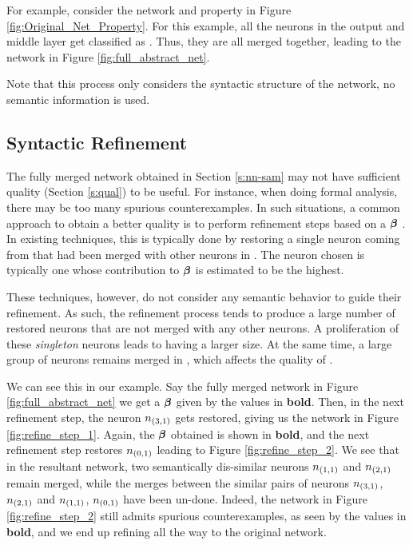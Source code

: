 


For example, consider the network and property in Figure
\ref{fig:Original_Net_Property}. For this example, all the neurons in the output
and middle layer get classified as \inc. Thus, they are all merged together,
leading to the network in Figure \ref{fig:full_abstract_net}.

Note that this process only considers the syntactic structure of the network, no
semantic information is used.

\subsection{ Syntactic Refinement }

The fully merged network obtained in Section \ref{s:nn-sam} may not have
sufficient quality (Section \ref{s:qual}) to be useful. For instance, when doing
formal analysis, there may be too many spurious counterexamples. In such
situations, a common approach to obtain a better quality \abs is to perform
refinement steps based on a \gencex $\boldsymbol{\beta}$
\cite{cegar-nn,cegarette,cleverest-nn}. In
existing techniques, this is typically done by restoring a single neuron coming
from \cnc that had been merged with other neurons in \abs. The neuron chosen is
typically one whose contribution to $\boldsymbol{\beta}$ is estimated to be the
highest.

These techniques, however, do not consider any semantic behavior to guide their
refinement. As such, the refinement process tends to produce a large number of
restored neurons that are not merged with any other neurons. A proliferation of
these \emph{singleton} neurons leads to \abs having a larger size. At the same time, 
a large group of neurons remains merged in \abs, which affects the quality of \abs. 

We can see this in our example. Say the fully merged network in Figure
\ref{fig:full_abstract_net} we get a $\boldsymbol{\beta}$ given by the values in \textbf{bold}.
Then, in the next refinement step, the neuron $n_{(3,1)}$ gets restored, giving
us the network in Figure \ref{fig:refine_step_1}. Again, the $\boldsymbol{\beta}$
obtained is shown in \textbf{bold}, and the next refinement step restores $n_{(0,1)}$
leading to Figure \ref{fig:refine_step_2}. We see that in the resultant network,
two semantically dis-similar neurons $n_{(1,1)}$ and $n_{(2,1)}$ remain merged,
while the merges between the similar pairs of neurons $n_{(3,1)}$, $n_{(2,1)}$
and $n_{(1,1)}$, $n_{(0,1)}$ have been un-done. Indeed, the network in Figure
\ref{fig:refine_step_2} still admits spurious counterexamples, as seen by the
values in \textbf{bold}, and we end up refining all the way to the original
network.



